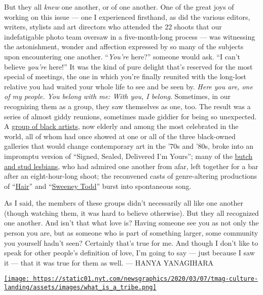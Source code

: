 But they all \emph{knew} one another, or of one another. One of the
great joys of working on this issue --- one I experienced firsthand, as
did the various editors, writers, stylists and art directors who
attended the 22 shoots that our indefatigable photo team oversaw in a
five-month-long process --- was witnessing the astonishment, wonder and
affection expressed by so many of the subjects upon encountering one
another. ``\emph{You're} here?'' someone would ask. ``I can't believe
\emph{you're} here!'' It was the kind of pure delight that's reserved
for the most special of meetings, the one in which you're finally
reunited with the long-lost relative you had waited your whole life to
see and be seen by. \emph{Here you are, one of my people. You belong
with me: With you, I belong}. Sometimes, in our recognizing them as a
group, they saw themselves as one, too. The result was a series of
almost giddy reunions, sometimes made giddier for being so unexpected. A
\href{https://www.nytimes.com/interactive/2020/04/13/t-magazine/black-art-galleries.html}{group
of black artists}, now elderly and among the most celebrated in the
world, all of whom had once showed at one or all of the three
black-owned galleries that would change contemporary art in the '70s and
'80s, broke into an impromptu version of ``Signed, Sealed, Delivered I'm
Yours''; many of the
\href{https://www.nytimes.com/interactive/2020/04/13/t-magazine/butch-stud-lesbian.html}{butch
and stud lesbians}, who had admired one another from afar, left together
for a bar after an eight-hour-long shoot; the reconvened casts of
genre-altering productions of
``\href{https://www.nytimes.com/interactive/2020/04/13/t-magazine/hair-musical-broadway.html}{Hair}''
and
``\href{https://www.nytimes.com/interactive/2020/04/13/t-magazine/sweeney-todd-revival.html}{Sweeney
Todd}'' burst into spontaneous song.

As I said, the members of these groups didn't necessarily all like one
another (though watching them, it was hard to believe otherwise). But
they all recognized one another. And isn't that what love is? Having
someone see you as not only the person you are, but as someone who is
part of something larger, some community you yourself hadn't seen?
Certainly that's true for me. And though I don't like to speak for other
people's definition of love, I'm going to say --- just because I saw it
--- that it was true for them as well. --- HANYA YANAGIHARA

\href{https://www.nytimes.com/interactive/2020/04/13/t-magazine/tribe-meaning.html}{\texttt{[image: https://static01.nyt.com/newsgraphics/2020/03/07/tmag-culture-landing/assets/images/what\_is\_a\_tribe.png]}}

